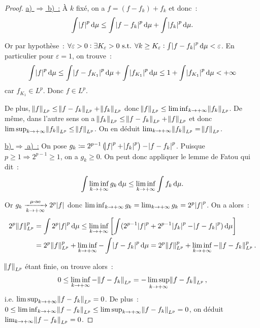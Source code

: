 \documentclass{article}
\newcommand{\pinfty}{{+\infty}}
\newcommand{\st}{\text{ s.t. }}
\begin{document}
\begin{proof} \underline {a) $\Rightarrow$ b)~:} À $k$ fixé, on a $f = (f-f_k) + f_k$ et donc~:
\[\int \abs f^p\dif\mu \leq \int\abs {f-f_k}^p\dif\mu + \int \abs {f_k}^p\dif\mu.\]

Or par hypothèse~: $\forall \varepsilon > 0 : \exists K_\varepsilon > 0 \st \forall k \geq K_\varepsilon : \int \abs {f-f_k}^p\dif\mu < \varepsilon$. En particulier
pour $\varepsilon = 1$, on trouve~:
\[\int \abs f^p\dif\mu \leq \int \abs {f-f_{K_1}}^p\dif\mu + \int\abs {f_{K_1}}^p\dif\mu \leq 1 + \int \abs{f_{K_1}}^p\dif\mu < \pinfty\]
car $f_{K_1} \in L^p$. Donc $f \in L^p$.

De plus, $\norm f_{L^p} \leq \norm {f-f_k}_{L^p} + \norm {f_k}_{L^p}$ donc $\norm f_{L^p} \leq \liminf_{k \to \pinfty}\norm {f_k}_{L^p}$. De même, dans l'autre sens on a
$\norm {f_k}_{L^p} \leq \norm {f-f_k}_{L^p} + \norm f_{L^p}$ et donc $\limsup_{k \to \pinfty}\norm {f_k}_{L^p} \leq \norm f_{L^p}$. On en déduit
$\lim_{k \to \pinfty}\norm {f_k}_{L^p} = \norm f_{L^p}$.

\underline {b) $\Rightarrow$ a)~:} On pose $g_k \coloneqq 2^{p-1}\left(\abs f^p + \abs {f_k}^p\right) - \abs {f-f_k}^p$.
Puisque $p \geq 1 \Rightarrow 2^{p-1} \geq 1$, on a $g_k \geq 0$. On peut donc appliquer le lemme de Fatou qui dit~:
\[\int\liminf_{k \to \pinfty}g_k\dif\mu \leq \liminf_{k \to \pinfty}\int f_k\dif\mu.\]

Or $g_k \xrightarrow[k \to \pinfty]{\mu\text{-ae}} 2^p\abs f$ donc $\liminf_{k \to \pinfty}g_k = \lim_{k \to \pinfty}g_k = 2^p\abs f^p$. On a alors~:
\begin{align*}
	2^p\norm f_{L^p}^p &= \int 2^p\abs f^p\dif\mu \leq \liminf_{k \to \pinfty}\left[\int (2^{p-1}\abs f^p + 2^{p-1}\abs {f_k}^p - \abs {f-f_k}^p)\dif\mu\right] \\
  	&= 2^p\norm f_{L^p}^p + \liminf_{k \to \pinfty}-\int\abs {f-f_k}^p\dif\mu = 2^p\norm f_{L^p}^p + \liminf_{k \to \pinfty}-\norm {f-f_k}_{L^p}^p.
\end{align*}

$\norm f_{L^p}$ étant finie, on trouve alors~:
\[0 \leq \liminf_{k \to \pinfty}-\norm {f-f_k}_{L^p} = -\limsup_{k \to \pinfty}\norm {f-f_k}_{L^p},\]
i.e. $\limsup_{k \to \pinfty}\norm {f-f_k}_{L^p} = 0$. De plus~: $0 \leq \liminf_{k \to \pinfty}\norm {f-f_k}_{L^p} \leq \limsup_{k \to \pinfty}\norm {f-f_k}_{L^p} = 0$,
on déduit $\lim_{k \to \pinfty}\norm {f-f_k}_{L^p} = 0$.
\end{proof}
\end{document}
